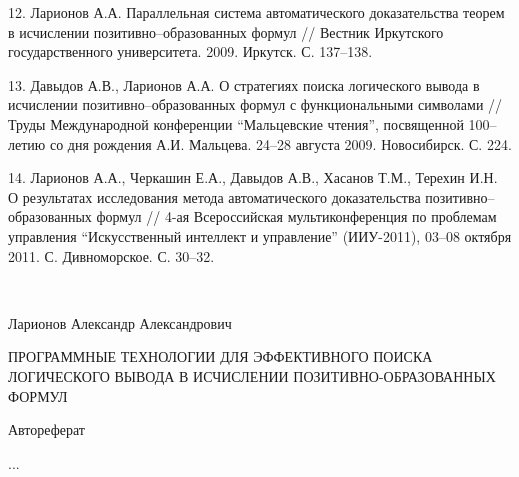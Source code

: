 \documentclass[a4paper]{report}
\begin{document}
12. Ларионов А.А. Параллельная система автоматического доказательства
теорем в исчислении позитивно--образованных формул // Вестник
Иркутского государственного университета. 2009. Иркутск. С. 137--138.

13. Давыдов А.В., Ларионов А.А. О стратегиях поиска логического вывода
в исчислении позитивно--образованных формул с функциональными
символами // Труды Международной конференции ``Мальцевские чтения'',
посвященной 100--летию со дня рождения А.И. Мальцева. 24--28 августа
2009. Новосибирск. С. 224.

14. Ларионов А.А., Черкашин Е.А., Давыдов А.В., Хасанов Т.М., Терехин
И.Н. О результатах исследования метода автоматического доказательства
позитивно--образованных формул // 4-ая Всероссийская мультиконференция
по проблемам управления ``Искусственный интеллект и управление''
(ИИУ-2011), 03--08 октября 2011. С. Дивноморское. С. 30--32.

\newpage
\mbox{~}
\vfill{}
\begin{center}

Ларионов Александр Александрович

ПРОГРАММНЫЕ ТЕХНОЛОГИИ ДЛЯ ЭФФЕКТИВНОГО ПОИСКА ЛОГИЧЕСКОГО ВЫВОДА В ИСЧИСЛЕНИИ ПОЗИТИВНО-ОБРАЗОВАННЫХ ФОРМУЛ

Автореферат

...
\end{center}
\vspace{1cm}{}
\mbox{~}
%
%
%
%
%

%

%
\end{document}
